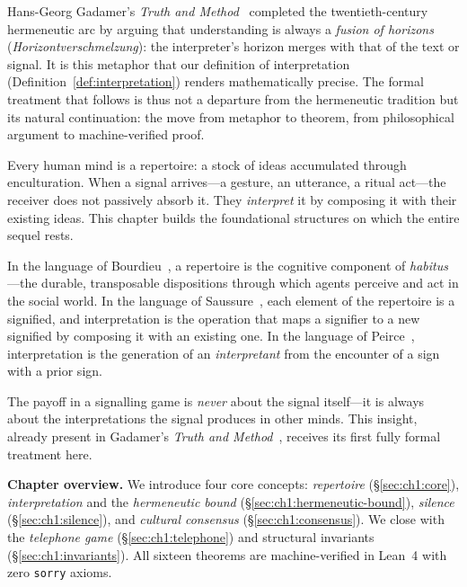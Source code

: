 Hans-Georg Gadamer's \emph{Truth and Method}~\cite{gadamer1960}
completed the twentieth-century hermeneutic arc by arguing that
understanding is always a \emph{fusion of horizons}
(\emph{Horizontverschmelzung}): the interpreter's horizon merges with
that of the text or signal.  It is this metaphor that our definition of
interpretation (Definition~\ref{def:interpretation}) renders
mathematically precise.  The formal treatment that follows is thus not a
departure from the hermeneutic tradition but its natural continuation:
the move from metaphor to theorem, from philosophical argument to
machine-verified proof.


Every human mind is a repertoire: a stock of ideas accumulated through
enculturation.  When a signal arrives---a gesture, an utterance, a ritual
act---the receiver does not passively absorb it.  They \emph{interpret}
it by composing it with their existing ideas.  This chapter builds the
foundational structures on which the entire sequel rests.

In the language of Bourdieu~\cite{bourdieu1984}, a repertoire is the
cognitive component of \emph{habitus}---the durable, transposable
dispositions through which agents perceive and act in the social world.
In the language of Saussure~\cite{saussure1916}, each element of the
repertoire is a signified, and interpretation is the operation that maps
a signifier to a new signified by composing it with an existing one.  In
the language of Peirce~\cite{peirce1931}, interpretation is the
generation of an \emph{interpretant} from the encounter of a sign with a
prior sign.

The payoff in a signalling game is \emph{never} about the signal
itself---it is always about the interpretations the signal produces in
other minds.  This insight, already present in Gadamer's
\emph{Truth and Method}~\cite{gadamer1960}, receives its first fully
formal treatment here.

\medskip
\noindent\textbf{Chapter overview.}  We introduce four core concepts:
\emph{repertoire} (\S\ref{sec:ch1:core}), \emph{interpretation} and the
\emph{hermeneutic bound} (\S\ref{sec:ch1:hermeneutic-bound}), \emph{silence}
(\S\ref{sec:ch1:silence}), and \emph{cultural consensus}
(\S\ref{sec:ch1:consensus}).
We close with the \emph{telephone game} (\S\ref{sec:ch1:telephone}) and
structural invariants (\S\ref{sec:ch1:invariants}).  All sixteen theorems
are machine-verified in Lean~4 with zero \texttt{sorry} axioms.

